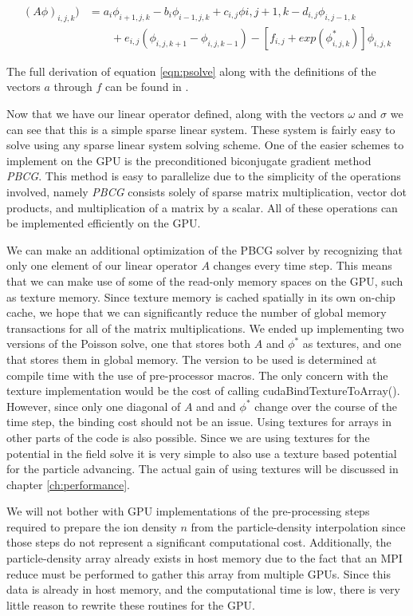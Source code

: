 \begin{align}
(A\phi)_{i,j,k}) &= a_i\phi_{i+1,j,k}
		  -b_i\phi_{i-1,j,k}
		  +c_{i,j}\phi{i,j+1,k}
		  -d_{i,j}\phi_{i,j-1,k} \nonumber \\
		  &\qquad{} +e_{i,j}(\phi_{i,j,k+1}-\phi_{i,j,k-1})
		  -[f_{i,j} + exp(\phi_{i,j,k}^*)]\phi_{i,j,k}
\label{eqn:psolve}
\end{align}

The full derivation of equation \ref{eqn:psolve} along with the definitions of the vectors $a$ through $f$ can be found in \cite{Patachini2010}.

Now that we have our linear operator defined, along with the vectors $\omega$ and $\sigma$ we can see that this is a simple sparse linear system. These system is fairly easy to solve using any sparse linear system solving scheme. One of the easier schemes to implement on the GPU is the preconditioned biconjugate gradient method \emph{PBCG}. This method is easy to parallelize due to the simplicity of the operations involved, namely \emph{PBCG} consists solely of sparse matrix multiplication, vector dot products, and multiplication of a matrix by a scalar. All of these operations can be implemented efficiently on the GPU. 

We can make an additional optimization of the PBCG solver by recognizing that only one element of our linear operator $A$ changes every time step. This means that we can make use of some of the read-only memory spaces on the GPU, such as texture memory. Since texture memory is cached spatially in its own on-chip cache, we hope that we can significantly reduce the number of global memory transactions for all of the matrix multiplications. We ended up implementing two versions of the Poisson solve, one that stores both $A$ and $\phi^*$ as textures, and one that stores them in global memory. The version to be used is determined at compile time with the use of pre-processor macros. 
The only concern with the texture implementation would be the cost of calling cudaBindTextureToArray(). However, since only one diagonal of $A$ and and $\phi^*$ change over the course of the time step, the binding cost should not be an issue. Using textures for arrays in other parts of the code is also possible. Since we are using textures for the potential in the field solve it is very simple to also use a texture based potential for the particle advancing. The actual gain of using textures will be discussed in chapter \ref{ch:performance}.

We will not bother with GPU implementations of the pre-processing steps required to prepare the ion density $n$ from the particle-density interpolation since those steps do not represent a significant computational cost. Additionally, the particle-density array already exists in host memory due to the fact that an MPI reduce must be performed to gather this array from multiple GPUs. Since this data is already in host memory, and the computational time is low, there is very little reason to rewrite these routines for the GPU.  


